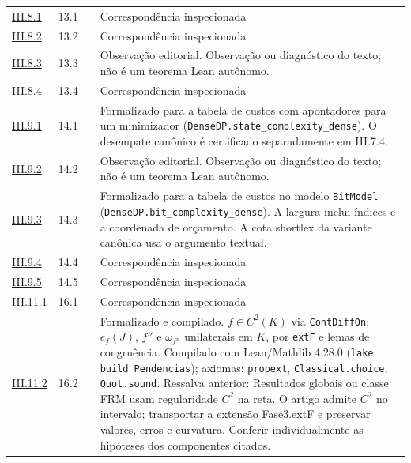 \documentclass[12pt,a4paper]{article}
\theoremstyle{preciso}
\theoremstyle{definition}
\newcommand{\code}[1]{\nolinkurl{#1}}
\theoremstyle{preciso}
\theoremstyle{preciso}
\theoremstyle{preciso}
\theoremstyle{preciso}
\theoremstyle{definition}
\theoremstyle{preciso}
\theoremstyle{definition}
\theoremstyle{preciso}
\theoremstyle{preciso}
\theoremstyle{definition}
\begin{document}
\begin{singlespace}
\begin{longtable}{@{}p{.11\linewidth}p{.09\linewidth}p{.09\linewidth}p{.59\linewidth}@{}}
\hyperref[map:artigo_2:8.1]{III.8.1} & 13.1 & \pageref{map:artigo_2:8.1} & Correspondência inspecionada\\[4pt]
\hyperref[map:artigo_2:8.2]{III.8.2} & 13.2 & \pageref{map:artigo_2:8.2} & Correspondência inspecionada\\[4pt]
\hyperref[map:artigo_2:8.3]{III.8.3} & 13.3 & \pageref{map:artigo_2:8.3} & Observação editorial. Observação ou diagnóstico do texto; não é um teorema Lean autônomo.\\[4pt]
\hyperref[map:artigo_2:8.4]{III.8.4} & 13.4 & \pageref{map:artigo_2:8.4} & Correspondência inspecionada\\[4pt]
\hyperref[map:artigo_2:9.1]{III.9.1} & 14.1 & \pageref{map:artigo_2:9.1} & Formalizado para a tabela de custos com apontadores para um minimizador (\code{DenseDP.state_complexity_dense}). O desempate canônico é certificado separadamente em III.7.4.\\[4pt]
\hyperref[map:artigo_2:9.2]{III.9.2} & 14.2 & \pageref{map:artigo_2:9.2} & Observação editorial. Observação ou diagnóstico do texto; não é um teorema Lean autônomo.\\[4pt]
\hyperref[map:artigo_2:9.3]{III.9.3} & 14.3 & \pageref{map:artigo_2:9.3} & Formalizado para a tabela de custos no modelo \code{BitModel} (\code{DenseDP.bit_complexity_dense}). A largura inclui índices e a coordenada de orçamento. A cota shortlex da variante canônica usa o argumento textual.\\[4pt]
\hyperref[map:artigo_2:9.4]{III.9.4} & 14.4 & \pageref{map:artigo_2:9.4} & Correspondência inspecionada\\[4pt]
\hyperref[map:artigo_2:9.5]{III.9.5} & 14.5 & \pageref{map:artigo_2:9.5} & Correspondência inspecionada\\[4pt]
\hyperref[map:artigo_2:11.1]{III.11.1} & 16.1 & \pageref{map:artigo_2:11.1} & Correspondência inspecionada\\[4pt]
\hyperref[map:artigo_2:11.2]{III.11.2} & 16.2 & \pageref{map:artigo_2:11.2} & Formalizado e compilado. $f\in C^2(K)$ via \texttt{ContDiffOn}; $e_f(J)$, $f''$ e $\omega_{f''}$ unilaterais em $K$, por \texttt{extF} e lemas de congruência. Compilado com Lean/Mathlib 4.28.0 (\texttt{lake build Pendencias}); axiomas: \texttt{propext}, \texttt{Classical.choice}, \texttt{Quot.sound}. Ressalva anterior: Resultados globais ou classe FRM usam regularidade $C^2$ na reta. O artigo admite $C^2$ no intervalo; transportar a extensão Fase3.extF e preservar valores, erros e curvatura. Conferir individualmente as hipóteses dos componentes citados.\\[4pt]

\end{longtable}
\end{singlespace}
\end{document}
